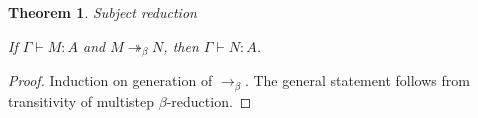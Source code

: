 \documentclass[a4paper]{article}
\newtheorem{theorem}{Theorem}
\begin{document}
\begin{theorem} Subject reduction

  If $\Gamma \vdash M : A$ and $M \twoheadrightarrow_{\beta} N$, then $\Gamma \vdash N : A$.
\end{theorem}

\begin{proof}

Induction on generation of $\rightarrow_{\beta}$. The general statement follows from transitivity of
multistep $\beta$-reduction.
\end{proof}
\end{document}
